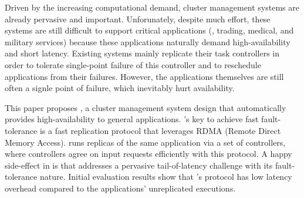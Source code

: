
Driven by the increasing computational demand, cluster management systems 
are already pervasive and important. Unforunately, despite much effort, these 
systems are still difficult to support critical applications (\eg, trading, 
medical, and military services) because these applications naturally demand 
high-availability and short latency. Existing systems mainly replicate their 
task controllers in order to tolerate single-point failure of this controller 
and to reschedule applications from their failures. However, the applications 
themselves are still often a signle point of failure, which inevitably hurt 
availability.


This paper proposes \xxx, a cluster management system design that automatically 
provides high-availability to general applications. \xxx's key to achieve fast 
fault-tolerance is a fast \paxos replication protocol that leverages RDMA 
(Remote Direct Memory Access). \xxx runs replicas of the same application via a 
set of controllers, where controllers agree on input requests efficiently with 
this protocol. A happy side-effect in \xxx is that \xxx addresses a pervasive 
tail-of-latency challenge with its fault-tolerance nature. Initial evaluation 
results show that \xxx's protocol has low latency overhead compared to the 
applications' unreplicated executions.



